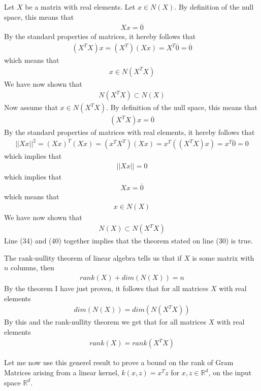 Let $X$ be a matrix with real elements. Let $x\in N(X)$. By definition of the null space, this means that
\begin{align}
Xx = \overline{0}
\end{align}
By the standard properties of matrices, it hereby follows that
\begin{align}
(X^TX)x = (X^T)(Xx)=X^T\overline{0}=\overline{0}
\end{align}
which means that
\begin{align}
x\in N(X^TX) 
\end{align}
We have now shown that
\begin{align}
N(X^TX)\subset N(X)
\end{align}
Now assume that $x\in N(X^TX)$. By definition of the null space, this means that
\begin{align}
(X^T X)x = \overline{0}
\end{align}
By the standard properties of matrices with real elements, it hereby follows that
\begin{align}
||Xx||^2 = (Xx)^T(Xx)=(x^TX^T)(Xx)=x^T((X^TX)x)=x^T\overline{0}=0
\end{align}
which implies that
\begin{align}
||Xx||=0
\end{align}
which implies that
\begin{align}
Xx=\overline{0}
\end{align}
which means that
\begin{align}
x\in N(X)
\end{align}
We have now shown that 
\begin{align}
N(X)\subset N(X^TX)
\end{align}
Line (34) and (40) together implies that the theorem stated on line (30) is true.

The rank-nullity theorem of linear algebra tells us that if $X$ is some matrix with $n$ columns, then 
\begin{align}
rank(X) + dim(N(X)) = n 
\end{align}
By the theorem I have just proven, it follows that for all matrices $X$ with real elements
\begin{align}
dim(N(X))=dim(N(X^TX))
\end{align}
By this and the rank-nullity theorem we get that for all matrices $X$ with real elements
\begin{align}
rank(X) = rank(X^TX)
\end{align}

Let me now use this generel result to prove a bound on the rank of Gram Matrices arising from a linear kernel, $k(x,z)=x^Tz$ for $x,z \in \mathbb{R}^d$, on the input space $\mathbb{R}^d$. 

